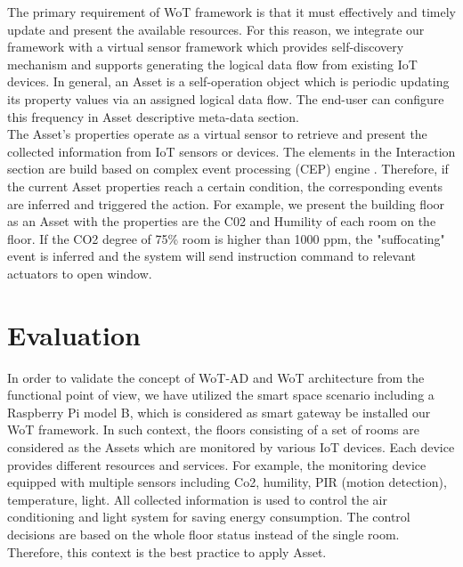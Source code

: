The primary requirement of WoT framework is that it must effectively and timely update and present the available resources. For this reason, we integrate our framework with a virtual sensor framework \cite{kim2017scalable} which provides self-discovery mechanism and supports generating the logical data flow from existing IoT devices. In general, an Asset is a self-operation object which is periodic updating its property values via an assigned logical data flow. The end-user can configure this frequency in Asset descriptive meta-data section.\\

The Asset's properties operate as a virtual sensor to retrieve and present the collected information from IoT sensors or devices. The elements in the Interaction section are build based on complex event processing (CEP) engine \cite{chen2014complex}. Therefore, if the current Asset properties reach a certain condition, the corresponding events are inferred and triggered the action. For example, we present the building floor as an Asset with the properties are the C02 and Humility of each room on the floor. If the CO2 degree of 75\% room is higher than 1000 ppm, the "suffocating" event is inferred and the system will send instruction command to relevant actuators to open window.


\section{Evaluation}
In order to validate the concept of WoT-AD and WoT architecture from the functional point of view, we have utilized the smart space scenario including a Raspberry Pi model B, which is considered as smart gateway be installed our WoT framework. In such context, the floors consisting of a set of rooms are considered as the Assets which are monitored by various IoT devices. Each device provides different resources and services. For example, the monitoring device equipped with multiple sensors including Co2, humility, PIR (motion detection), temperature, light. All collected information is used to control the air conditioning and light system for saving energy consumption. The control decisions are based on the whole floor status instead of the single room. Therefore, this context is the best practice to apply Asset. \\

